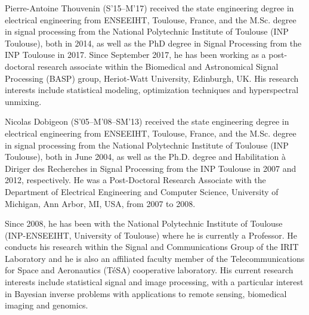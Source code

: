 \documentclass[journal,final,letterpaper,twoside,twocolumn]{IEEEtran}
\begin{document}




\begin{IEEEbiography}{Pierre-Antoine Thouvenin} (S'15--M'17) received the state engineering degree in electrical engineering from ENSEEIHT, Toulouse, France, and the M.Sc. degree in signal processing from the National Polytechnic Institute of Toulouse (INP Toulouse), both in 2014, as well as the PhD degree in Signal Processing from the INP Toulouse in 2017. Since September 2017, he has been working as a post-doctoral research associate within the Biomedical and Astronomical Signal Processing (BASP) group, Heriot-Watt University, Edinburgh, UK. His research interests include statistical modeling, optimization techniques and hyperspectral unmixing.
\end{IEEEbiography}

\begin{IEEEbiography}{Nicolas Dobigeon} (S'05--M'08--SM'13) received the state engineering degree in electrical engineering from ENSEEIHT, Toulouse, France, and the M.Sc. degree in signal
processing from the National Polytechnic Institute of Toulouse (INP Toulouse), both in June 2004, as well as the Ph.D. degree and Habilitation {\`a} Diriger des Recherches in Signal Processing from the INP Toulouse in 2007 and 2012, respectively.
He was a Post-Doctoral Research Associate with the Department of Electrical Engineering and Computer Science, University of Michigan, Ann Arbor, MI, USA, from 2007 to 2008.

Since 2008, he has been with the National Polytechnic Institute of Toulouse (INP-ENSEEIHT, University of Toulouse) where he is currently a Professor. He conducts his research within the Signal and Communications Group of the IRIT Laboratory and he is also an affiliated faculty member of the Telecommunications for Space and Aeronautics (T{\'e}SA) cooperative laboratory.
His current research interests include statistical signal and image processing, with a particular interest in Bayesian inverse problems with applications to remote sensing, biomedical imaging and genomics.
\end{IEEEbiography}
\end{document}
